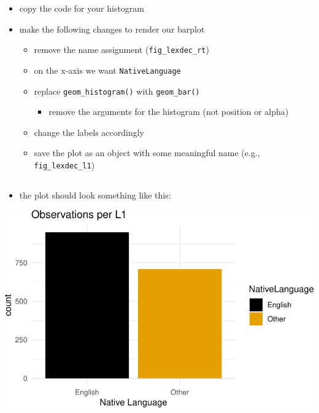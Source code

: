 \documentclass[
  letterpaper,
  DIV=11]{scrartcl}
\providecommand{\tightlist}{%
  \setlength{\itemsep}{0pt}\setlength{\parskip}{0pt}}\usepackage{longtable,booktabs,array}
\theoremstyle{definition}
\theoremstyle{remark}
\begin{document}
\begin{itemize}
\tightlist
\item
  copy the code for your histogram
\item
  make the following changes to render our barplot

  \begin{itemize}
  \tightlist
  \item
    remove the name assignment (\texttt{fig\_lexdec\_rt})
  \item
    on the x-axis we want \texttt{NativeLanguage}
  \item
    replace \texttt{geom\_histogram()} with \texttt{geom\_bar()}

    \begin{itemize}
    \tightlist
    \item
      remove the arguments for the histogram (not position or alpha)
    \end{itemize}
  \item
    change the labels accordingly
  \item
    save the plot as an object with some meaningful name (e.g.,
    \texttt{fig\_lexdec\_l1})
  \end{itemize}
\end{itemize}

\hypertarget{section-1}{%
\subsection{}\label{section-1}}

\begin{itemize}
\tightlist
\item
  the plot should look something like this:
\end{itemize}

\includegraphics{_intro_r_slides_files/figure-pdf/unnamed-chunk-26-1.pdf}
\end{document}
